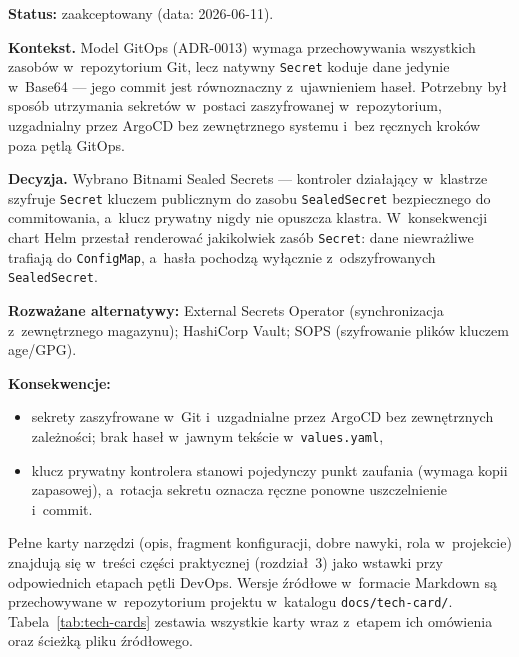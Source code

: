 
\textbf{Status:} zaakceptowany (data: 2026-06-11).

\textbf{Kontekst.} Model GitOps (ADR-0013) wymaga przechowywania wszystkich zasobów w~repozytorium Git, lecz natywny \texttt{Secret} koduje dane jedynie w~Base64 --- jego commit jest równoznaczny z~ujawnieniem haseł. Potrzebny był sposób utrzymania sekretów w~postaci zaszyfrowanej w~repozytorium, uzgadnialny przez ArgoCD bez zewnętrznego systemu i~bez ręcznych kroków poza pętlą GitOps.

\textbf{Decyzja.} Wybrano Bitnami Sealed Secrets --- kontroler działający w~klastrze szyfruje \texttt{Secret} kluczem publicznym do zasobu \texttt{SealedSecret} bezpiecznego do commitowania, a~klucz prywatny nigdy nie opuszcza klastra. W~konsekwencji chart Helm przestał renderować jakikolwiek zasób \texttt{Secret}: dane niewrażliwe trafiają do \texttt{ConfigMap}, a~hasła pochodzą wyłącznie z~odszyfrowanych \texttt{SealedSecret}.

\textbf{Rozważane alternatywy:} External Secrets Operator (synchronizacja z~zewnętrznego magazynu); HashiCorp Vault; SOPS (szyfrowanie plików kluczem age/GPG).

\textbf{Konsekwencje:}
\begin{itemize}
  \item[$+$] sekrety zaszyfrowane w~Git i~uzgadnialne przez ArgoCD bez zewnętrznych zależności; brak haseł w~jawnym tekście w~\texttt{values.yaml},
  \item[$-$] klucz prywatny kontrolera stanowi pojedynczy punkt zaufania (wymaga kopii zapasowej), a~rotacja sekretu oznacza ręczne ponowne uszczelnienie i~commit.
\end{itemize}


\newpage
{}

Pełne karty narzędzi (opis, fragment konfiguracji, dobre nawyki, rola w~projekcie) znajdują się w~treści części praktycznej (rozdział~3) jako wstawki przy odpowiednich etapach pętli DevOps. Wersje źródłowe w~formacie Markdown są przechowywane w~repozytorium projektu w~katalogu \texttt{docs/tech-card/}. Tabela~\ref{tab:tech-cards} zestawia wszystkie karty wraz z~etapem ich omówienia oraz ścieżką pliku źródłowego.

